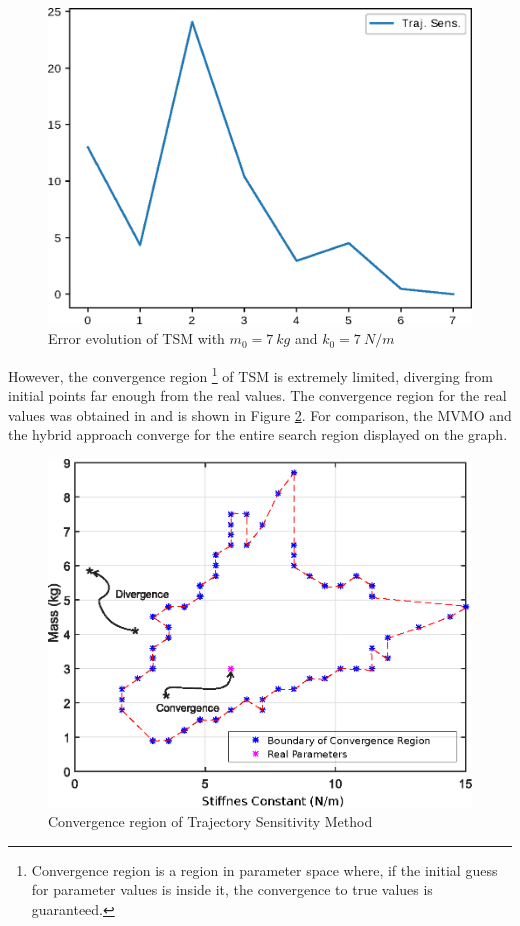 \begin{figure}[h]
	\caption{Error evolution of TSM with $m_{0} = 7\ kg$ and $k_{0} = 7\ N/m$}
	\begin{center}
		\includegraphics[scale=0.7]{Images/TS_conv.eps}
	\end{center}
	\label{fig: TS_conv}
\end{figure}

However, the convergence region \footnote{Convergence region is a region in parameter space where, if the initial guess for parameter values is inside it, the convergence to true values is guaranteed.} of TSM is extremely limited, diverging from initial points far enough from the real values. The convergence region for the real values was obtained in \cite{Ecyo} and is shown in Figure \ref{fig: conv_reg}. For comparison, the MVMO and the hybrid approach converge for the entire search region displayed on the graph.

\begin{figure}[h]
	\caption{Convergence region of Trajectory Sensitivity Method}
	\begin{center}
		\includegraphics[scale=0.7]{Images/Conv_reg.eps}
	\end{center}
	\label{fig: conv_reg}
\end{figure}

